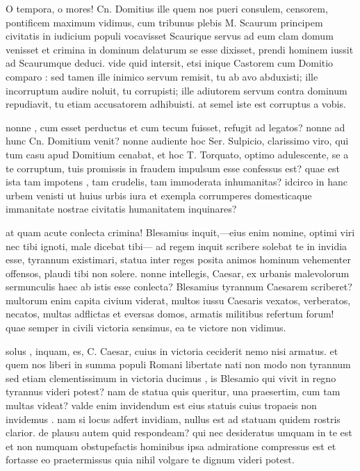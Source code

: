  O tempora, o mores! Cn. Domitius ille quem nos pueri consulem, censorem, pontificem maximum vidimus, cum tribunus plebis M. Scaurum principem civitatis in iudicium populi vocavisset Scaurique servus ad eum clam domum venisset et crimina in dominum delaturum se esse dixisset, prendi hominem iussit ad Scaurumque deduci. vide quid intersit, etsi inique Castorem cum Domitio comparo : sed tamen ille inimico servum remisit, tu ab avo abduxisti; ille incorruptum audire noluit, tu corrupisti; ille adiutorem servum contra dominum repudiavit, tu etiam accusatorem adhibuisti. at semel iste est corruptus a vobis.

 nonne , cum esset perductus et cum tecum fuisset, refugit ad legatos? nonne ad hunc Cn. Domitium venit? nonne audiente hoc Ser. Sulpicio, clarissimo viro, qui tum casu apud Domitium cenabat, et hoc T. Torquato, optimo adulescente, se a te corruptum, tuis promissis in fraudem impulsum esse confessus est? quae est ista tam impotens , tam crudelis, tam immoderata inhumanitas? idcirco in hanc urbem venisti ut huius urbis iura et exempla corrumperes domesticaque immanitate nostrae civitatis humanitatem inquinares?

 at quam acute conlecta crimina! Blesamius inquit,—eius enim nomine, optimi viri nec tibi ignoti, male dicebat tibi— ad regem inquit scribere solebat te in invidia esse, tyrannum existimari, statua inter reges posita animos hominum vehementer offensos, plaudi tibi non solere. nonne intellegis, Caesar, ex urbanis malevolorum sermunculis haec ab istis esse conlecta? Blesamius tyrannum Caesarem scriberet? multorum enim capita civium viderat, multos iussu Caesaris vexatos, verberatos, necatos, multas adflictas et eversas domos, armatis militibus refertum forum! quae semper in civili victoria sensimus, ea te victore non vidimus.

 solus , inquam, es, C. Caesar, cuius in victoria ceciderit nemo nisi armatus. et quem nos liberi in summa populi Romani libertate nati non modo non tyrannum sed etiam clementissimum in victoria ducimus , is Blesamio qui vivit in regno tyrannus videri potest? nam de statua quis queritur, una praesertim, cum tam multas videat? valde enim invidendum est eius statuis cuius tropaeis non invidemus . nam si locus adfert invidiam, nullus est ad statuam quidem rostris clarior. de plausu autem quid respondeam? qui nec desideratus umquam in te est et non numquam obstupefactis hominibus ipsa admiratione compressus est et fortasse eo praetermissus quia nihil volgare te dignum videri potest.

